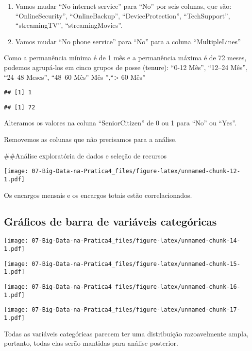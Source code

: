 \documentclass[]{article}
\begin{document}
\begin{enumerate}
\def\labelenumi{\arabic{enumi}.}
\item
  Vamos mudar ``No internet service'' para ``No'' por seis colunas, que
  são: ``OnlineSecurity'', ``OnlineBackup'', ``DeviceProtection'',
  ``TechSupport'', ``streamingTV'', ``streamingMovies''.
\item
  Vamos mudar ``No phone service'' para ``No'' para a coluna
  ``MultipleLines''
\end{enumerate}

Como a permanência mínima é de 1 mês e a permanência máxima é de 72
meses, podemos agrupá-los em cinco grupos de posse (tenure): ``0-12
Mês'', ``12--24 Mês'', ``24--48 Meses'', ``48--60 Mês'' Mês
'',``\textgreater{} 60 Mês''

\begin{verbatim}
## [1] 1
\end{verbatim}

\begin{verbatim}
## [1] 72
\end{verbatim}

Alteramos os valores na coluna ``SeniorCitizen'' de 0 ou 1 para ``No''
ou ``Yes''.

Removemos as colunas que não precisamos para a análise.

\#\#Análise exploratória de dados e seleção de recursos

\texttt{[image: 07-Big-Data-na-Pratica4\_files/figure-latex/unnamed-chunk-12-1.pdf]}

Os encargos mensais e os encargos totais estão correlacionados.

\hypertarget{gruxe1ficos-de-barra-de-variuxe1veis-categuxf3ricas}{%
\subsection{Gráficos de barra de variáveis
categóricas}\label{gruxe1ficos-de-barra-de-variuxe1veis-categuxf3ricas}}

\texttt{[image: 07-Big-Data-na-Pratica4\_files/figure-latex/unnamed-chunk-14-1.pdf]}

\texttt{[image: 07-Big-Data-na-Pratica4\_files/figure-latex/unnamed-chunk-15-1.pdf]}

\texttt{[image: 07-Big-Data-na-Pratica4\_files/figure-latex/unnamed-chunk-16-1.pdf]}

\texttt{[image: 07-Big-Data-na-Pratica4\_files/figure-latex/unnamed-chunk-17-1.pdf]}

Todas as variáveis categóricas parecem ter uma distribuição
razoavelmente ampla, portanto, todas elas serão mantidas para análise
posterior.
\end{document}
